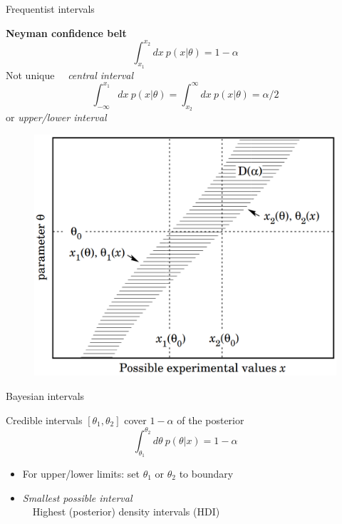 \documentclass[
aspectratio=169,
14pt,
professionalfonts
]{beamer}
\newcommand{\arrow}{~\ding{220}~}
\begin{document}
\begin{frame}{Frequentist intervals}

\begin{minipage}[t]{0.55\linewidth}
\textbf{Neyman confidence belt}
$$
\int_{x_1}^{x_2} dx ~ p(x|\theta) = 1-\alpha
$$
Not unique \arrow \textit{central interval}
\small
$$
\int_{-\infty}^{x_1} dx ~ p(x|\theta)=  \int_{x_2}^{\infty} dx ~ p(x|\theta) = \alpha/2
$$
\normalsize
or \textit{upper/lower interval}
\end{minipage}
\begin{minipage}[t]{0.44\linewidth}
    \begin{figure}
        \centering
        \includegraphics[width=\linewidth]{../plots/neyman.png}
    \end{figure}
\end{minipage}
\end{frame}

\begin{frame}{Bayesian intervals}

Credible intervals $[\theta_1, \theta_2]$ cover $1-\alpha$ of the posterior
$$
\int_{\theta_1}^{\theta_2} d\theta ~ p(\theta| x) = 1-\alpha
$$
\begin{itemize}
    \item For upper/lower limits: set $\theta_1$ or $\theta_2$ to boundary
    \item \textit{Smallest possible interval}\\
        \arrow Highest (posterior) density intervals (HDI)
\end{itemize}
\end{frame}
\end{document}
